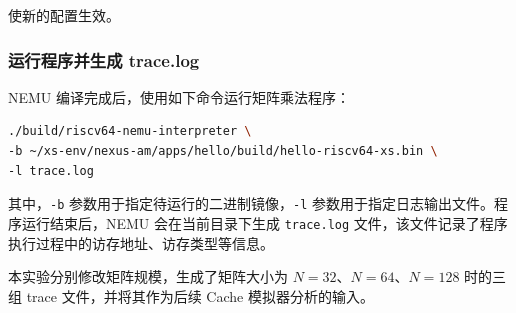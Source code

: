 使新的配置生效。

\subsubsection{运行程序并生成 trace.log}

NEMU 编译完成后，使用如下命令运行矩阵乘法程序：

\begin{lstlisting}[language=bash]
./build/riscv64-nemu-interpreter \
-b ~/xs-env/nexus-am/apps/hello/build/hello-riscv64-xs.bin \
-l trace.log
\end{lstlisting}

其中，\texttt{-b} 参数用于指定待运行的二进制镜像，\texttt{-l} 参数用于指定日志输出文件。程序运行结束后，NEMU 会在当前目录下生成 \texttt{trace.log} 文件，该文件记录了程序执行过程中的访存地址、访存类型等信息。

本实验分别修改矩阵规模，生成了矩阵大小为 $N=32$、$N=64$、$N=128$ 时的三组 trace 文件，并将其作为后续 Cache 模拟器分析的输入。